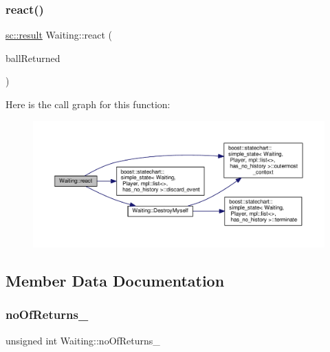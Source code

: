 \subsubsection{\texorpdfstring{react()}{react()}\hspace{0.1cm}{\footnotesize\ttfamily [2/2]}}
{\footnotesize\ttfamily \mbox{\hyperlink{namespaceboost_1_1statechart_abe807f6598b614d6d87bb951ecd92331}{sc\+::result}} Waiting\+::react (\begin{DoxyParamCaption}\item[{const \mbox{\hyperlink{struct_ball_returned}{Ball\+Returned}} \&}]{ball\+Returned }\end{DoxyParamCaption})\hspace{0.3cm}{\ttfamily [inline]}}

Here is the call graph for this function\+:
\nopagebreak
\begin{figure}[H]
\begin{center}
\leavevmode
\includegraphics[width=350pt]{struct_waiting_a8c34737a1eb91381c14fb9647958f41b_cgraph}
\end{center}
\end{figure}


\subsection{Member Data Documentation}
\mbox{\label{struct_waiting_a34e5cb3810b8c1c5199cd9a9d81b6480}} 
\subsubsection{\texorpdfstring{no\+Of\+Returns\+\_\+}{noOfReturns\_}}
{\footnotesize\ttfamily unsigned int Waiting\+::no\+Of\+Returns\+\_\+\hspace{0.3cm}{\ttfamily [private]}}

